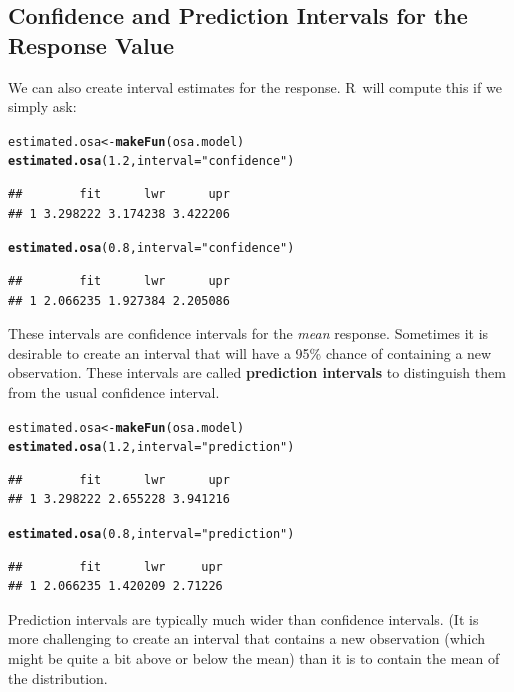 \documentclass[twoside]{book}
\makeatletter
\newcommand{\hlnum}[1]{\textcolor[rgb]{0.686,0.059,0.569}{#1}}%
\newcommand{\hlstr}[1]{\textcolor[rgb]{0.192,0.494,0.8}{#1}}%
\newcommand{\hlstd}[1]{\textcolor[rgb]{0.345,0.345,0.345}{#1}}%
\newcommand{\hlkwb}[1]{\textcolor[rgb]{0.69,0.353,0.396}{#1}}%
\newcommand{\hlkwc}[1]{\textcolor[rgb]{0.333,0.667,0.333}{#1}}%
\newcommand{\hlkwd}[1]{\textcolor[rgb]{0.737,0.353,0.396}{\textbf{#1}}}%
\newenvironment{kframe}{%
 \def\at@end@of@kframe{}%
 \ifinner\ifhmode%
  \def\at@end@of@kframe{\end{minipage}}%
  \begin{minipage}{\columnwidth}%
 \fi\fi%
 \def\FrameCommand##1{\hskip\@totalleftmargin \hskip-\fboxsep
 \colorbox{shadecolor}{##1}\hskip-\fboxsep
     \hskip-\linewidth \hskip-\@totalleftmargin \hskip\columnwidth}%
 \MakeFramed {\advance\hsize-\width
   \@totalleftmargin\z@ \linewidth\hsize
   \@setminipage}}%
 {\par\unskip\endMakeFramed%
 \at@end@of@kframe}
\newenvironment{knitrout}{}{} %
\def\R{{\sf R}}
\def\term#1{\textbf{#1}}
\makeatother
\begin{document}
\subsection{Confidence and Prediction Intervals for the Response Value}
We can also create interval estimates for the response.    \R\ will compute
this if we simply ask:
\begin{knitrout}
\color{fgcolor}\begin{kframe}
\begin{alltt}
\hlstd{estimated.osa} \hlkwb{<-} \hlkwd{makeFun}\hlstd{(osa.model)}
\hlkwd{estimated.osa}\hlstd{(}\hlnum{1.2}\hlstd{,} \hlkwc{interval} \hlstd{=} \hlstr{"confidence"}\hlstd{)}
\end{alltt}
\begin{verbatim}
##        fit      lwr      upr
## 1 3.298222 3.174238 3.422206
\end{verbatim}
\begin{alltt}
\hlkwd{estimated.osa}\hlstd{(}\hlnum{0.8}\hlstd{,} \hlkwc{interval} \hlstd{=} \hlstr{"confidence"}\hlstd{)}
\end{alltt}
\begin{verbatim}
##        fit      lwr      upr
## 1 2.066235 1.927384 2.205086
\end{verbatim}
\end{kframe}
\end{knitrout}
These intervals are confidence intervals for the \emph{mean} response.  Sometimes it
is desirable to create an interval that will have a 95\% chance of containing a new 
observation.  These intervals are called \term{prediction intervals} to distinguish
them from the usual confidence interval.
\begin{knitrout}
\color{fgcolor}\begin{kframe}
\begin{alltt}
\hlstd{estimated.osa} \hlkwb{<-} \hlkwd{makeFun}\hlstd{(osa.model)}
\hlkwd{estimated.osa}\hlstd{(}\hlnum{1.2}\hlstd{,} \hlkwc{interval} \hlstd{=} \hlstr{"prediction"}\hlstd{)}
\end{alltt}
\begin{verbatim}
##        fit      lwr      upr
## 1 3.298222 2.655228 3.941216
\end{verbatim}
\begin{alltt}
\hlkwd{estimated.osa}\hlstd{(}\hlnum{0.8}\hlstd{,} \hlkwc{interval} \hlstd{=} \hlstr{"prediction"}\hlstd{)}
\end{alltt}
\begin{verbatim}
##        fit      lwr     upr
## 1 2.066235 1.420209 2.71226
\end{verbatim}
\end{kframe}
\end{knitrout}
Prediction intervals are typically much wider than confidence intervals.  (It is more challenging
to create an interval that contains a new observation (which might be quite a bit above 
or below the mean) than it is to contain the mean of the distribution.
\end{document}
